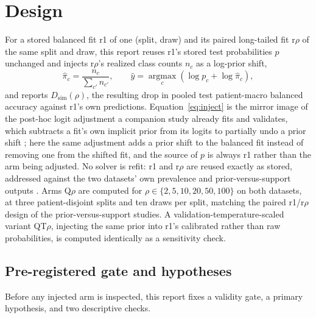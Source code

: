 \documentclass[11pt]{article}
\begin{document}
\section{Design}
\label{sec:design}
For a stored balanced fit r1 of one (split, draw) and its paired long-tailed fit r$\rho$ of the same split and draw, this report reuses r1's stored test probabilities $p$ unchanged and injects r$\rho$'s realized class counts $n_c$ as a log-prior shift,
\begin{equation}
  \hat\pi_c = \frac{n_c}{\sum_{c'} n_{c'}}, \qquad
  \hat y = \operatorname*{argmax}_c \left(\log p_c + \log \hat\pi_c\right),
  \label{eq:inject}
\end{equation}
\noindent and reports $D_{\mathrm{sim}}(\rho)$, the resulting drop in pooled test patient-macro balanced accuracy against r1's own predictions. Equation~\eqref{eq:inject} is the mirror image of the post-hoc logit adjustment a companion study already fits and validates, which subtracts a fit's own implicit prior from its logits to partially undo a prior shift \citep{queisler2026causeTcga, menon2021longTail}; here the same adjustment adds a prior shift to the balanced fit instead of removing one from the shifted fit, and the source of $p$ is always r1 rather than the arm being adjusted. No solver is refit: r1 and r$\rho$ are reused exactly as stored, addressed against the two datasets' own prevalence and prior-versus-support outputs \citep{queisler2026prevalenceTcga, queisler2026prevalenceBracs, queisler2026causeTcga, queisler2026causeBracs}. Arms Q$\rho$ are computed for $\rho\in\{2,5,10,20,50,100\}$ on both datasets, at three patient-disjoint splits and ten draws per split, matching the paired r1/r$\rho$ design of the prior-versus-support studies. A validation-temperature-scaled variant QT$\rho$, injecting the same prior into r1's calibrated rather than raw probabilities, is computed identically as a sensitivity check.

\subsection{Pre-registered gate and hypotheses}
\label{sec:gate}
Before any injected arm is inspected, this report fixes a validity gate, a primary hypothesis, and two descriptive checks.
\end{document}
